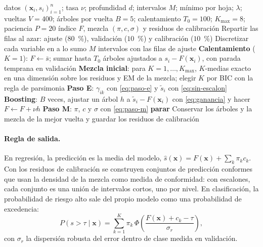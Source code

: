 \begin{algorithm}[tbp]
  \caption{Ajuste de BDL.}
  \label{alg:bdl}
  \small
  \begin{algorithmic}[1]
    \Require datos $(\bm{x}_i, s_i)_{i=1}^{n}$; tasa $\nu$; profundidad $d$; intervalos $M$; mínimo por hoja; $\lambda$;
             vueltas $V = 400$; árboles por vuelta $B = 5$; calentamiento $T_0 = 100$; $K_{\max} = 8$; paciencia $P = 20$
    \Ensure índice $F$, mezcla $(\pi, c, \sigma)$ y residuos de calibración
    \State Repartir las filas al azar: ajuste ($80$~\%), validación ($10$~\%) y calibración ($10$~\%)
    \State Discretizar cada variable en a lo sumo $M$ intervalos con las filas de ajuste
    \State \textbf{Calentamiento} ($K = 1$): $F \gets \bar{s}$; sumar hasta $T_0$ árboles ajustados a $s_i - F(\bm{x}_i)$, con parada temprana en validación
    \State \textbf{Mezcla inicial}: para $K = 1, \dots, K_{\max}$, $K$-medias exacto en una dimensión sobre los residuos y EM de la mezcla; elegir $K$ por BIC con la regla de parsimonia
      \State \textbf{Paso E}: $\gamma_{ik}$ con \eqref{eq:paso-e} y $\tilde{s}_i$ con \eqref{eq:sin-escalon}
      \State \textbf{Boosting}: $B$ veces, ajustar un árbol $h$ a $\tilde{s}_i - F(\bm{x}_i)$ con \eqref{eq:ganancia} y hacer $F \gets F + \nu h$
      \State \textbf{Paso M}: $\pi$, $c$ y $\sigma$ con \eqref{eq:paso-m}
       \textbf{parar} \EndIf
    \EndFor
    \State Conservar los árboles y la mezcla de la mejor vuelta y guardar los residuos de calibración
  \end{algorithmic}
\end{algorithm}

\paragraph{Regla de salida.}
En regresión, la predicción es la media del modelo, $\hat{s}(\bm{x}) = F(\bm{x}) + \sum_k \pi_k c_k$. Con los residuos de
calibración se construyen conjuntos de predicción conformes \citep{vovk2005} que usan la densidad de la mezcla como
medida de conformidad: con escalones, cada conjunto es una unión de intervalos cortos, uno por nivel. En clasificación,
la probabilidad de riesgo alto sale del propio modelo como una probabilidad de excedencia:
\begin{equation}
  P(s > \tau \mid \bm{x}) = \sum_{k=1}^{K} \pi_k\, \Phi\!\left(\frac{F(\bm{x}) + c_k - \tau}{\sigma_r}\right),
  \label{eq:excedencia}
\end{equation}
con $\sigma_r$ la dispersión robusta del error dentro de clase medida en validación.

